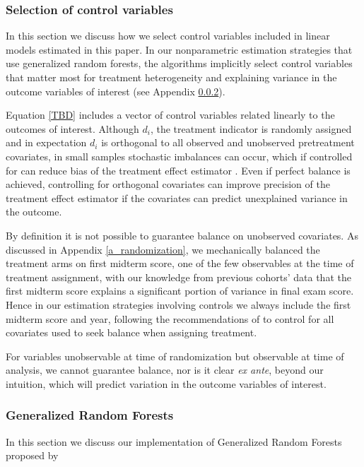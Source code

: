 \documentclass[12pt]{article}
\begin{document}
\subsubsection{Selection of control variables} \label{a_selection}

In this section we discuss how we select control variables included in linear models estimated in this paper. In our nonparametric estimation strategies that use generalized random forests, the algorithms implicitly select control variables that matter most for treatment heterogeneity and explaining variance in the outcome variables of interest (see Appendix \ref{a_grf}).

Equation \ref{TBD} includes a vector of control variables related linearly to the outcomes of interest. Although $d_i$, the treatment indicator is randomly assigned and in expectation $d_i$ is orthogonal to all observed and unobserved pretreatment covariates, in small samples stochastic imbalances can occur, which if controlled for can reduce bias of the treatment effect estimator \parencite{ai2017}. Even if perfect balance is achieved, controlling for orthogonal covariates can improve precision of the treatment effect estimator if the covariates can predict unexplained variance in the outcome.

By definition it is not possible to guarantee balance on unobserved covariates. As discussed in Appendix \ref{a_randomization}, we mechanically balanced the treatment arms on first midterm score, one of the few observables at the time of treatment assignment, with our knowledge from previous cohorts' data that the first midterm score explains a significant portion of variance in final exam score. Hence in our estimation strategies involving controls we always include the first midterm score and year, following the recommendations of \textcite{bm2009} to control for all covariates used to seek balance when assigning treatment.

For variables unobservable at time of randomization but observable at time of analysis, we cannot guarantee balance, nor is it clear \textit{ex ante}, beyond our intuition, which will predict variation in the outcome variables of interest.

\subsubsection{Generalized Random Forests} \label{a_grf}

In this section we discuss our implementation of Generalized Random Forests proposed by \textcite{atw2019}


\item
\end{document}
